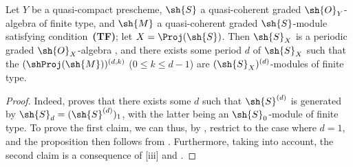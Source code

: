 \begin{proposition}[8.14.14]
\label{II.8.14.14}
Let $Y$ be a quasi-compact prescheme, $\sh{S}$ a quasi-coherent graded $\sh{O}_Y$-algebra of finite type, and $\sh{M}$ a quasi-coherent graded $\sh{S}$-module satisfying condition~\textbf{(TF)};
let $X=\Proj(\sh{S})$.
Then $\sh{S}_X$ is a periodic graded $\sh{O}_X$-algebra , and there exists
some period $d$ of $\sh{S}_X$ such that the $(\shProj(\sh{M}))^{(d,k)}$ ($0\leq k\leq d-1$) are $(\sh{S}_X)^{(d)}$-modules of finite type.
\end{proposition}

\begin{proof}
Indeed,  proves that there exists some $d$ such that $\sh{S}^{(d)}$ is generated by $\sh{S}_d=(\sh{S}^{(d)})_1$, with the latter being an $\sh{S}_0$-module of finite type.
To prove the first claim, we can thus, by , restrict to the case where $d=1$, and the proposition then follows from .
Furthermore, taking  into account, the second claim is a consequence of [iii] and .
\end{proof}
